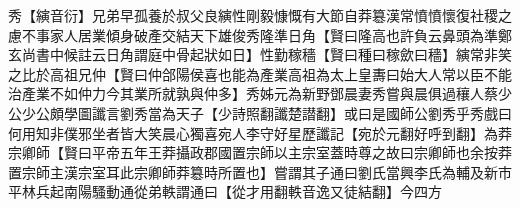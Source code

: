 秀【縯音衍】兄弟早孤養於叔父良縯性剛毅慷慨有大節自莽簒漢常憤憤懷復社稷之慮不事家人居業傾身破產交結天下雄俊秀隆準日角【賢曰隆高也許負云鼻頭為準鄭玄尚書中候註云日角謂庭中骨起狀如日】性勤稼穡【賢曰種曰稼歛曰穡】縯常非笑之比於高祖兄仲【賢曰仲郃陽侯喜也能為產業高祖為太上皇夀曰始大人常以臣不能治產業不如仲力今其業所就孰與仲多】秀姊元為新野鄧晨妻秀嘗與晨俱過穰人蔡少公少公頗學圖讖言劉秀當為天子【少詩照翻讖楚譛翻】或曰是國師公劉秀乎秀戲曰何用知非僕邪坐者皆大笑晨心獨喜宛人李守好星歷讖記【宛於元翻好呼到翻】為莽宗卿師【賢曰平帝五年王莽攝政郡國置宗師以主宗室蓋時尊之故曰宗卿師也余按莽置宗師主漢宗室耳此宗卿師莽簒時所置也】嘗謂其子通曰劉氏當興李氏為輔及新市平林兵起南陽騷動通從弟軼謂通曰【從才用翻軼音逸又徒結翻】今四方